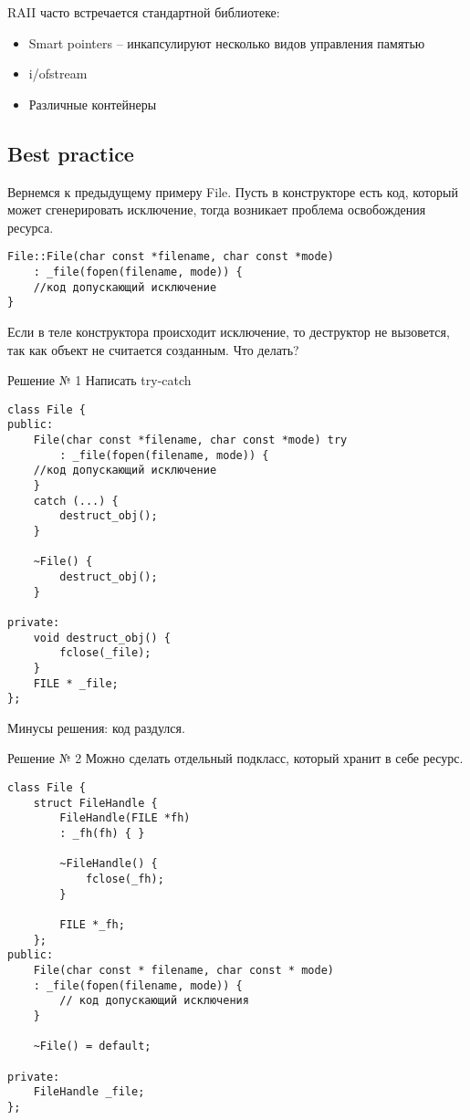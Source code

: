 RAII часто встречается стандартной библиотеке:
\begin{itemize}
\item Smart pointers -- инкапсулируют несколько видов управления памятью
\item i/ofstream
\item Различные контейнеры
\end{itemize}

\subsection{Best practice}

Вернемся к предыдущему примеру File.
Пусть в конструкторе есть код, который может сгенерировать исключение, тогда возникает проблема освобождения ресурса.

\begin{verbatim}
File::File(char const *filename, char const *mode)
    : _file(fopen(filename, mode)) {
    //код допускающий исключение
}
\end{verbatim}
Если в теле конструктора происходит исключение, то деструктор не вызовется, так как объект не считается созданным. Что делать?

Решение № 1
Написать try-catch
\begin{verbatim}
class File {
public:
    File(char const *filename, char const *mode) try
        : _file(fopen(filename, mode)) {
    //код допускающий исключение
    }
    catch (...) {
        destruct_obj();
    }

    ~File() {
        destruct_obj();
    }

private:
    void destruct_obj() {
        fclose(_file);
    }
    FILE * _file;
};
\end{verbatim}
Минусы решения: код раздулся.

Решение № 2
Можно сделать отдельный подкласс, который хранит в себе ресурс.
\begin{verbatim}
class File {
    struct FileHandle {
        FileHandle(FILE *fh)
        : _fh(fh) { }

        ~FileHandle() {
            fclose(_fh);
        }

        FILE *_fh;
    };
public:
    File(char const * filename, char const * mode)
    : _file(fopen(filename, mode)) {
        // код допускающий исключения
    }

    ~File() = default;

private:
    FileHandle _file;
};
\end{verbatim}

